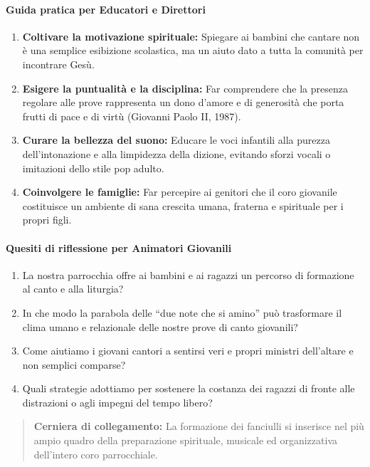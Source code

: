 \documentclass[12pt,a4paper]{article}
\begin{document}
	\paragraph{Guida pratica per Educatori e Direttori}\label{guida-pratica-per-educatori-e-direttori}
	
	\begin{enumerate}[label=\arabic*.,leftmargin=*]
		\item \textbf{Coltivare la motivazione spirituale:} Spiegare ai bambini che cantare non è una semplice esibizione scolastica, ma un aiuto dato a tutta la comunità per incontrare Gesù.
		\item \textbf{Esigere la puntualità e la disciplina:} Far comprendere che la presenza regolare alle prove rappresenta un dono d'amore e di generosità che porta frutti di pace e di virtù (Giovanni Paolo II, 1987).
		\item \textbf{Curare la bellezza del suono:} Educare le voci infantili alla purezza dell'intonazione e alla limpidezza della dizione, evitando sforzi vocali o imitazioni dello stile pop adulto.
		\item \textbf{Coinvolgere le famiglie:} Far percepire ai genitori che il coro giovanile costituisce un ambiente di sana crescita umana, fraterna e spirituale per i propri figli.
	\end{enumerate}
	
	\paragraph{Quesiti di riflessione per Animatori Giovanili}\label{quesiti-di-riflessione-per-animatori-giovanili}
	
	\begin{enumerate}[label=\arabic*.,leftmargin=*]
		\item La nostra parrocchia offre ai bambini e ai ragazzi un percorso di formazione al canto e alla liturgia?
		\item In che modo la parabola delle ``due note che si amino'' può trasformare il clima umano e relazionale delle nostre prove di canto giovanili?
		\item Come aiutiamo i giovani cantori a sentirsi veri e propri ministri dell'altare e non semplici comparse?
		\item Quali strategie adottiamo per sostenere la costanza dei ragazzi di fronte alle distrazioni o agli impegni del tempo libero?
	\end{enumerate}
	
	\begin{quote}
		\textbf{Cerniera di collegamento:} La formazione dei fanciulli si inserisce nel più ampio quadro della preparazione spirituale, musicale ed organizzativa dell'intero coro parrocchiale.
	\end{quote}
	
\end{document}
